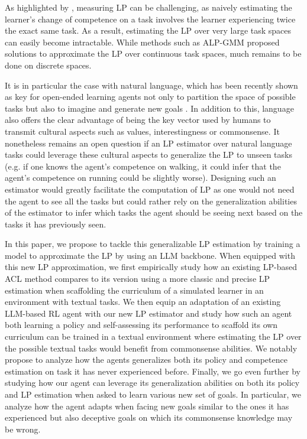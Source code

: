 As highlighted by \citet{kaplan_search_2007}, measuring LP can be challenging, as naively estimating the learner's change of competence on a task involves the learner experiencing twice the exact same task. As a result, estimating the LP over very large task spaces can easily become intractable. While methods such as ALP-GMM \cite{portelas_teacher_2019} proposed solutions to approximate the LP over continuous task spaces, much remains to be done on discrete spaces. 

It is in particular the case with natural language, which has been recently shown as key for open-ended learning agents not only to partition the space of possible tasks but also to imagine and generate new goals \cite{colas_language_2020,colas_vygotskian_2022}. In addition to this, language also offers the clear advantage of being the key vector used by humans to transmit cultural aspects such as values, interestingness or commonsense. It nonetheless remains an open question if an LP estimator over natural language tasks could leverage these cultural aspects to generalize the LP to unseen tasks (e.g. if one knows the agent's competence on walking, it could infer that the agent's competence on running could be slightly worse). Designing such an estimator would greatly facilitate the computation of LP as one would not need the agent to see all the tasks but could rather rely on the generalization abilities of the estimator to infer which tasks the agent should be seeing next based on the tasks it has previously seen.

In this paper, we propose to tackle this generalizable LP estimation by training a model to approximate the LP by using an LLM backbone. When equipped with this new LP approximation, we first empirically study how an existing LP-based ACL method compares to its version using a more classic and precise LP estimation \cite{baranes_r-iac_2009} when scaffolding the curriculum of a simulated learner in an environment with textual tasks. We then equip an adaptation of an existing LLM-based RL agent \cite{carta_grounding_2023} with our new LP estimator and study how such an agent both learning a policy and self-assessing its performance to scaffold its own curriculum can be trained in a textual environment where estimating the LP over the possible textual tasks would benefit from commonsense abilities. We notably propose to analyze how the agents generalizes both its policy and competence estimation on task it has never experienced before. Finally, we go even further by studying how our agent can leverage its generalization abilities on both its policy and LP estimation when asked to learn various new set of goals. In particular, we analyze how the agent adapts when facing new goals similar to the ones it has experienced but also deceptive goals on which its commonsense knowledge may be wrong.

